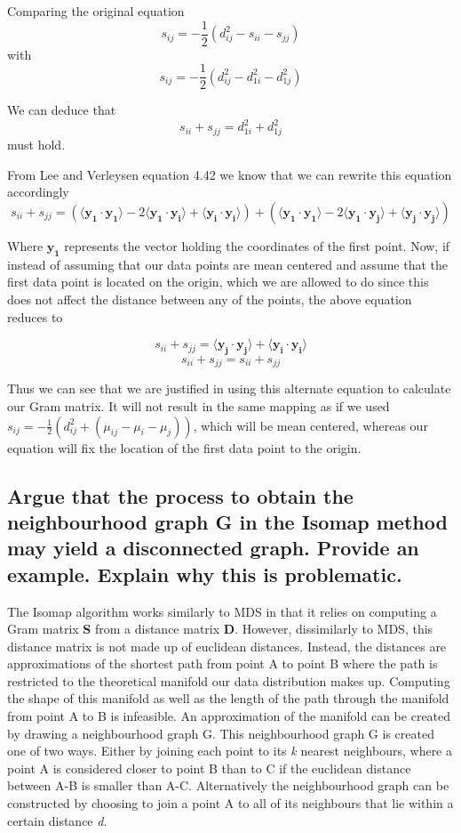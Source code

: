 \documentclass[11pt,a4paper,landscape]{article}
\begin{document}
Comparing the original equation
$$ s_{ij} = -\frac{1}{2}(d^{2}_{ij} - s_{ii} - s_{jj})$$
with
$$s_{ij} = -\frac{1}{2}(d_{ij}^{2} - d_{1i}^{2} - d_{1j}^{2})$$

We can deduce that
$$s_{ii} + s_{jj} = d_{1i}^{2} + d_{1j}^{2}$$
must hold.\newline

From Lee and Verleysen \cite{book} equation 4.42 we know that we can rewrite this equation accordingly
$$ s_{ii} + s_{jj} = (\langle \mathbf{y_{1}} \cdot \mathbf{y_{1}} \rangle - 2\langle \mathbf{y_{1}} \cdot \mathbf{y_{i}} \rangle + \langle \mathbf{y_{i}} \cdot \mathbf{y_{i}} \rangle) + (\langle \mathbf{y_{1}} \cdot \mathbf{y_{1}} \rangle - 2\langle \mathbf{y_{1}} \cdot \mathbf{y_{j}} \rangle + \langle \mathbf{y_{j}} \cdot \mathbf{y_{j}} \rangle)$$

Where $\mathbf{y_{1}}$ represents the vector holding the coordinates of the first point. Now, if instead of assuming that our data points are mean centered and assume that the first data point is located on the origin, which we are allowed to do since this does not affect the distance between any of the points, the above equation reduces to

$$ s_{ii} + s_{jj} = \langle \mathbf{y_{j}} \cdot \mathbf{y_{j}} \rangle + \langle \mathbf{y_{i}} \cdot \mathbf{y_{i}} \rangle$$
$$ s_{ii} + s_{jj} = s_{ii} + s_{jj} $$

Thus we can see that we are justified in using this alternate equation to calculate our Gram matrix. It will not result in the same mapping as if we used $ s_{ij} = -\frac{1}{2}(d^{2}_{ij} +( \mu_{ij} - \mu_{i} - \mu_{j}))$, which will be mean centered, whereas our equation will fix the location of the first data point to the origin.


\subsection{Argue that the process to obtain the neighbourhood graph G in the Isomap method may yield a disconnected graph.  Provide an example.  Explain why this is problematic.}

The Isomap algorithm works similarly to MDS in that it relies on computing a Gram matrix \textbf{S} from a distance matrix \textbf{D}. However, dissimilarly to MDS, this distance matrix is not made up of euclidean distances. Instead, the distances are approximations of the shortest path from point A to point B where the path is restricted to the theoretical manifold our data distribution makes up. Computing the shape of this manifold as well as the length of the path through the manifold from point A to B is infeasible. An approximation of the manifold can be created by drawing a neighbourhood graph G. This neighbourhood graph G is created one of two ways. Either by joining each point to its \textit{k} nearest neighbours, where a point A is considered closer to point B than to C if the euclidean distance between A-B is smaller than A-C.  Alternatively the neighbourhood graph can be constructed by choosing to join a point A to all of its neighbours that lie within a certain distance \textit{d}.\newline
\end{document}
